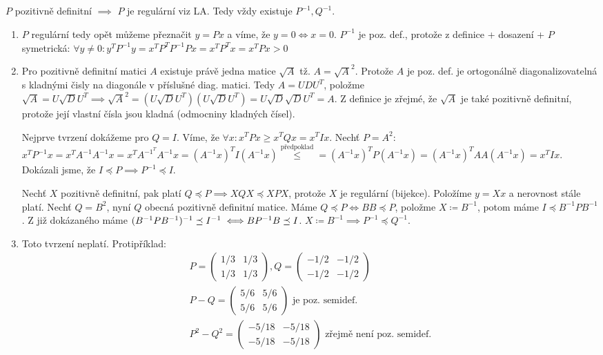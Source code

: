 \documentclass[12pt, a4paper]{article}
\begin{document}
\subsection{}
$P$ pozitivně definitní $\implies$ $P$ je regulární viz LA. Tedy vždy existuje $P^{-1}, Q^{-1}$.
\begin{enumerate}[label=(\alph*)]
\item $P$ regulární tedy opět můžeme přeznačit $y = Px$ a víme, že $y=0 \iff x=0$. $P^{-1}$ je poz. def., protože z definice + dosazení + $P$ symetrická: $\forall y \neq 0: y^T P^{-1} y = x^T P^T P^{-1} P x = x^T P^T x = x^T P x > 0$
\item Pro pozitivně definitní matici $A$ existuje právě jedna matice $\sqrt{A}$ tž. $A = \sqrt{A}^2$. Protože $A$ je poz. def. je ortogonálně diagonalizovatelná s kladnými čisly na diagonále v příslušné diag. matici. Tedy $A = UDU^T$, položme $\sqrt{A}=U \sqrt{D} U^T \implies \sqrt{A}^2 = (U \sqrt{D} U^T)(U \sqrt{D} U^T) = U \sqrt{D} \sqrt{D} U^T = A$. Z definice je zřejmé, že $\sqrt{A}$ je také pozitivně definitní, protože její vlastní čísla jsou kladná (odmocniny kladných čísel).

Nejprve tvrzení dokážeme pro $Q = I$. Víme, že $\forall x: x^T P x \geq x^T Q x = x^T I x$. Nechť $P = A^2$: $x^T P^{-1} x = x^T A^{-1} A^{-1} x = x^T A^{{-1}^T} A^{-1} x = (A^{-1}x)^T I (A^{-1}x) \stackrel{\text{předpoklad}}{\leq} =  (A^{-1}x)^T P (A^{-1}x)=  (A^{-1}x)^T AA (A^{-1}x)=x^T I x$. Dokázali jsme, že $I \preceq P \implies P^{-1} \preceq I$.

Nechť $X$ pozitivně definitní, pak platí $Q \preceq P \implies XQX \preceq XPX$, protože $X$ je regulární (bijekce). Položíme $y= Xx$ a nerovnost stále platí. Nechť $Q = B^2$, nyní $Q$ obecná pozitivně definitní matice. Máme $Q \preceq P \iff BB \preceq P$, položme $X \coloneqq B^{-1}$, potom máme $I \preceq B^{-1}PB^{-1}$. Z již dokázaného máme $(B^{-1}PB^{-1})^{-1} \preceq I^{-1} \iff \\BP^{-1}B \preceq I$. $X \coloneqq B^{-1} \implies P^{-1} \preceq Q^{-1}$.

\item Toto tvrzení neplatí. Protipříklad:
\begin{gather*}
P = \begin{pmatrix}
1/3 & 1/3\\
1/3 & 1/3
\end{pmatrix},
Q = \begin{pmatrix}
-1/2 & -1/2\\
-1/2 & -1/2
\end{pmatrix}
\\
P-Q = \begin{pmatrix}
5/6 & 5/6\\
5/6 & 5/6
\end{pmatrix} \text{ je poz. semidef.}\\
P^2-Q^2 = \begin{pmatrix}
-5/18 & -5/18\\
-5/18 & -5/18
\end{pmatrix} \text{ zřejmě není poz. semidef.}
\end{gather*}
\end{enumerate}
\end{document}
